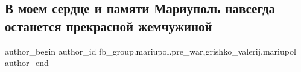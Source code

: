  
 
 
 
 

\subsection{В моем сердце и памяти Мариуполь навсегда останется прекрасной жемчужиной}
\label{sec:28_01_2023.fb.fb_group.mariupol.pre_war.1.v_moem_serdtse_i_pam}
 
\ifcmt
 author_begin
   author_id fb_group.mariupol.pre_war,grishko_valerij.mariupol
 author_end
\fi
